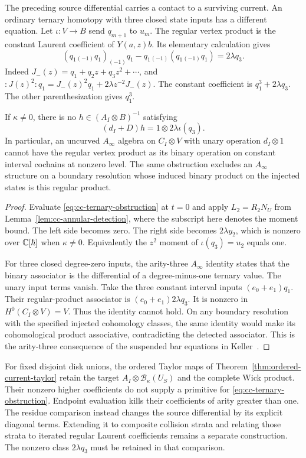 The preceding source differential carries a contact to a surviving
current.  An ordinary ternary homotopy with three closed state inputs
has a different equation.  Let
$\iota:V\to B$ send $q_{m+1}$ to $u_m$.
The regular vertex product is the constant Laurent coefficient of
$Y(a,z)b$.  Its elementary calculation gives
\[
 (q_1{}_{(-1)}q_1)_{(-1)}q_1
     -q_1{}_{(-1)}(q_1{}_{(-1)}q_1)=2\lambda q_3.
\]
Indeed $J_-(z)=q_1+q_2z+q_3z^2+\cdots$, and
$:J(z)^2:q_1=J_-(z)^2q_1+2\lambda z^{-2}J_-(z)$.
The constant coefficient is $q_1^3+2\lambda q_3$.
The other parenthesization gives $q_1^3$.

\begin{proposition}
\label{prop:cc-ternary-obstruction}
If $\kappa\ne0$, there is no $h\in(A_I\otimes B)^{-1}$ satisfying
\begin{equation}
\label{eq:cc-ternary-obstruction}
 (d_I+D)h=1\otimes2\lambda\iota(q_3).
\end{equation}
In particular, an uncurved $A_\infty$ algebra on $C_I\otimes V$ with
unary operation $d_I\otimes1$ cannot have the regular vertex product
as its binary operation on constant interval cochains at nonzero level.
The same obstruction excludes an $A_\infty$ structure on a boundary
resolution whose induced binary product on the injected states is this
regular product.
\end{proposition}
\begin{proof}
Evaluate \eqref{eq:cc-ternary-obstruction} at $t=0$ and apply
$L_2=R_2N_U$ from Lemma~\ref{lem:cc-annular-detection}, where the subscript
here denotes the moment bound.  The left side becomes zero.
The right side becomes $2\lambda y_2$, which is nonzero over
$\mathbb C[\hbar]$ when $\kappa\ne0$.
Equivalently the $z^2$ moment of $\iota(q_3)=u_2$ equals one.

For three closed degree-zero inputs, the arity-three $A_\infty$ identity
states that the binary associator is the differential of a degree-minus-one
ternary value.  The unary input terms vanish.
Take the three constant interval inputs $(e_0+e_1)q_1$.
Their regular-product associator is
$(e_0+e_1)2\lambda q_3$.  It is nonzero in $H^0(C_I\otimes V)=V$.
Thus the identity cannot hold.  On any boundary resolution with the
specified injected cohomology classes, the same identity would make its
cohomological product associative, contradicting the detected associator.
This is the arity-three consequence of the suspended bar equations in
Keller~\cite[\S3.6, pp.~11--12]{KellerAInfinity}.
\end{proof}

For fixed disjoint disk unions, the ordered Taylor maps of
Theorem~\ref{thm:ordered-current-taylor} retain the target
$A_I\otimes\mathcal B_\kappa(U_S)$ and the complete Wick product.
Their nonzero higher coefficients do not supply a primitive for
\eqref{eq:cc-ternary-obstruction}.  Endpoint evaluation kills their
coefficients of arity greater than one.
The residue comparison instead changes the source differential by its
explicit diagonal terms.  Extending it to composite collision strata and
relating those strata to iterated regular Laurent coefficients remains a
separate construction.  The nonzero class $2\lambda q_3$ must be retained
in that comparison.
